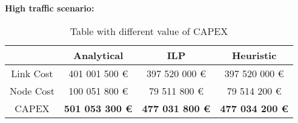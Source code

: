 \vspace{11pt}
\textbf{High traffic scenario:}\\

\begin{table}[h!]
\centering
\begin{tabular}{| c | c | c | c |}
 \hline
   & Analytical & ILP & Heuristic \\
 \hline\hline
 Link Cost & 401 001 500 \euro & 397 520 000 \euro & 397 520 000 \euro \\
 Node Cost & 100 051 800 \euro & 79 511 800 \euro & 79 514 200 \euro \\
 CAPEX & \textbf{501 053 300 \euro} & \textbf{477 031 800 \euro} & \textbf{477 034 200 \euro} \\
 \hline
\end{tabular}
\caption{Table with different value of CAPEX }
\label{table_comparative_opaque_protec_ref_3}
\end{table}


